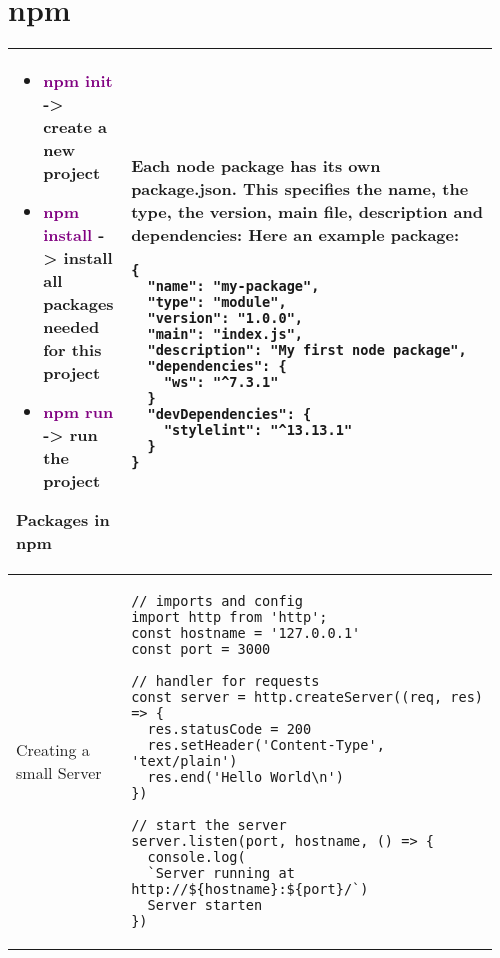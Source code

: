 \documentclass[main.tex,fontsize=8pt,paper=a4,paper=portrait,DIV=calc,]{scrartcl}
\begin{document}
\begin{table}[ht!]
\section{npm}
\begin{tabular}{|m{0.2\linewidth}|m{0.755\linewidth}|}
\hline
\begin{itemize}
\item \textcolor{purple}{npm init} -> create a new project
\item \textcolor{purple}{npm install} -> install all packages needed for this project
\item \textcolor{purple}{npm run} -> run the project
\vspace{-3mm}
\end{itemize} 
\hline
Packages in npm & 
Each node package has its own \textbf{package.json}.\newline
This specifies \textbf{the name, the type, the version, main file, description and dependencies}:\newline
Here an example package:\newline
\begin{lstlisting}
{
  "name": "my-package",
  "type": "module",
  "version": "1.0.0",
  "main": "index.js",
  "description": "My first node package",
  "dependencies": {
    "ws": "^7.3.1"
  }
  "devDependencies": {
    "stylelint": "^13.13.1"
  }
}
\end{lstlisting}\\
\hline
Creating a small Server & 
\begin{lstlisting}
// imports and config
import http from 'http';
const hostname = '127.0.0.1'
const port = 3000

// handler for requests
const server = http.createServer((req, res) => {
  res.statusCode = 200
  res.setHeader('Content-Type', 'text/plain')
  res.end('Hello World\n')
})

// start the server
server.listen(port, hostname, () => {
  console.log(
  `Server running at http://${hostname}:${port}/`)
  Server starten
})
\end{lstlisting}\\
\hline

\hline

\hline

\hline
\end{tabular}
\end{table}
\end{document}
